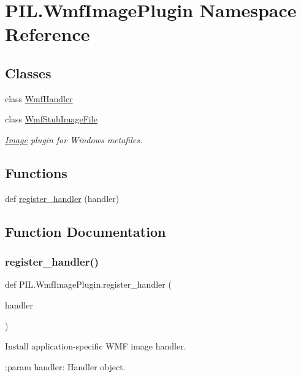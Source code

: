 \hypertarget{namespacePIL_1_1WmfImagePlugin}{}\section{P\+I\+L.\+Wmf\+Image\+Plugin Namespace Reference}
\label{namespacePIL_1_1WmfImagePlugin}
\subsection*{Classes}
\begin{DoxyCompactItemize}
\item 
class \hyperlink{classPIL_1_1WmfImagePlugin_1_1WmfHandler}{Wmf\+Handler}
\item 
class \hyperlink{classPIL_1_1WmfImagePlugin_1_1WmfStubImageFile}{Wmf\+Stub\+Image\+File}
\begin{DoxyCompactList}\small\item\em \hyperlink{namespacePIL_1_1Image}{Image} plugin for Windows metafiles. \end{DoxyCompactList}\end{DoxyCompactItemize}
\subsection*{Functions}
\begin{DoxyCompactItemize}
\item 
def \hyperlink{namespacePIL_1_1WmfImagePlugin_a43fcbb651799a41b1ea14ce6a9094312}{register\+\_\+handler} (handler)
\end{DoxyCompactItemize}


\subsection{Function Documentation}
\mbox{\label{namespacePIL_1_1WmfImagePlugin_a43fcbb651799a41b1ea14ce6a9094312}} 
\subsubsection{\texorpdfstring{register\+\_\+handler()}{register\_handler()}}
{\footnotesize\ttfamily def P\+I\+L.\+Wmf\+Image\+Plugin.\+register\+\_\+handler (\begin{DoxyParamCaption}\item[{}]{handler }\end{DoxyParamCaption})}

\begin{DoxyVerb}Install application-specific WMF image handler.

:param handler: Handler object.
\end{DoxyVerb}
 